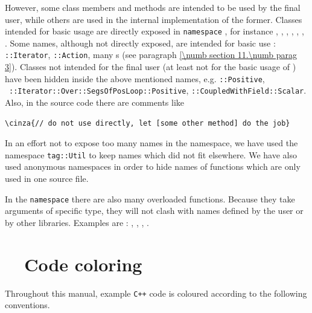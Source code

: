 However, some class members and methods are intended to be used by the final user,
while others are used in the internal implementation of the former.
Classes \hbox{intended} for basic usage are directly exposed in {\small\tt namespace}
{\small\tt{}}, for instance
{\small\tt{}}, {\small\tt{}},
{\small\tt{}}, {\small\tt{}}, {\small\tt{}},
{\small\tt{}}, {\small\tt{}}.
Some names, although not directly exposed, are intended for basic use :
{\small\tt{}::Iterator}, {\small\tt{}::Action},
many {\small\tt{}}s (see paragraph \ref{\numb section 11.\numb parag 3}).
Classes not intended for the final user (at least not for the basic usage of \maniFEM)
have been hidden inside the above mentioned names, e.g. {\small\tt{}::Positive},
\ {\small\tt{}::Iterator::Over::SegsOfPosLoop::Positive},
\hbox{\small\tt{}::CoupledWithField::Scalar}.
Also, in the source code there are comments like

\begin{Verbatim}[commandchars=\\\{\},formatcom=\small\tt,baselinestretch=0.94]
   \cinza{// do not use directly, let [some other method] do the job}
\end{Verbatim}

In an effort not to expose too many names in the {\small\tt{}} namespace, we have
used the namespace {\small\tt\textcolor{tag}{tag}::Util} to keep names which did not fit elsewhere.
We have also used anonymous namespaces in order to hide names of functions which are
only used in one source file.

In the {\small\tt namespace} {\small\tt{}} there are also many overloaded functions.
Because they take arguments of specific type, they will not clash with names defined
by the user or by other libraries.
Examples are : {\small\tt{}}, {\small\tt{}}, {\small\tt{}},
{\small\tt{}}.


\section{~~Code coloring}\label{\numb section 11.\numb parag 2}

Throughout this manual, example {\tt C++} code is coloured according to the following
conventions.

